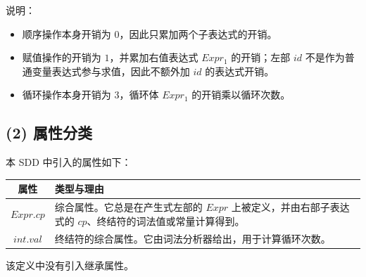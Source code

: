 \documentclass[12pt]{article}
\begin{document}
说明：
\begin{itemize}
    \item 顺序操作本身开销为 $0$，因此只累加两个子表达式的开销。
    \item 赋值操作的开销为 $1$，并累加右值表达式 $Expr_1$ 的开销；左部 $id$ 不是作为普通变量表达式参与求值，因此不额外加 $id$ 的表达式开销。
    \item 循环操作本身开销为 $3$，循环体 $Expr_1$ 的开销乘以循环次数。
\end{itemize}

\subsection*{(2) 属性分类}

本 SDD 中引入的属性如下：

\begin{center}
\begin{tabular}{|c|p{10cm}|}
\hline
属性 & 类型与理由 \\
\hline
$Expr.cp$ & 综合属性。它总是在产生式左部的 $Expr$ 上被定义，并由右部子表达式的 $cp$、终结符的词法值或常量计算得到。 \\
\hline
$int.val$ & 终结符的综合属性。它由词法分析器给出，用于计算循环次数。 \\
\hline
\end{tabular}
\end{center}

该定义中没有引入继承属性。
\end{document}

